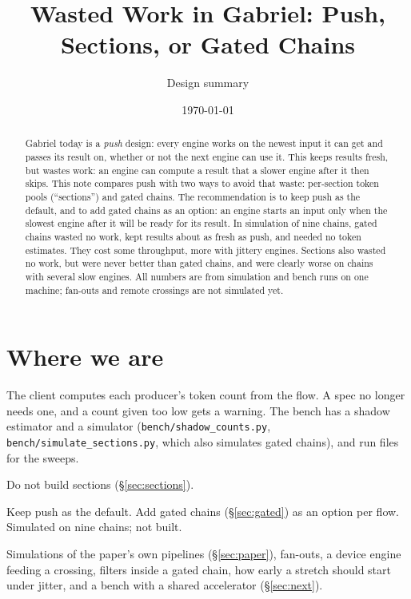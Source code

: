\documentclass[11pt]{article}
\title{Wasted Work in Gabriel: Push, Sections, or Gated Chains}
\author{Design summary}
\date{\today}
\newcommand{\code}[1]{\texttt{#1}}
\begin{document}
\maketitle

\begin{abstract}
Gabriel today is a \emph{push} design: every engine works on the newest
input it can get and passes its result on, whether or not the next engine
can use it. This keeps results fresh, but wastes work: an engine can compute
a result that a slower engine after it then skips. This note compares push
with two ways to avoid that waste: per-section token pools (``sections'')
and gated chains. The recommendation is to keep push as the default, and to
add gated chains as an option: an engine starts an input only when the
slowest engine after it will be ready for its result. In simulation of
nine chains, gated chains wasted no work, kept results about as fresh as
push, and needed no token estimates. They cost some throughput, more with
jittery engines. Sections also wasted no work, but were never better than
gated chains, and were clearly worse on chains with several slow engines.
All numbers are from simulation and bench runs on one machine; fan-outs and
remote crossings are not simulated yet.
\end{abstract}

\section{Where we are}

\begin{description}[style=nextline, leftmargin=1.5em, nosep]
  \item[Built] The client computes each producer's token count from the
        flow. A spec no longer needs one, and a count given too low gets a
        warning. The bench has a shadow estimator and a simulator
        (\code{bench/shadow\_counts.py}, \code{bench/simulate\_sections.py},
        which also simulates gated chains),
        and run files for the sweeps.
  \item[Decided] Do not build sections (\S\ref{sec:sections}).
  \item[Proposed] Keep push as the default. Add gated chains
        (\S\ref{sec:gated}) as an option per flow. Simulated on nine
        chains; not built.
  \item[Open] Simulations of the paper's own pipelines (\S\ref{sec:paper}),
        fan-outs, a device engine feeding a crossing, filters inside a
        gated chain, how early a stretch should start under jitter, and a
        bench with a shared accelerator (\S\ref{sec:next}).
\end{description}
\end{document}
